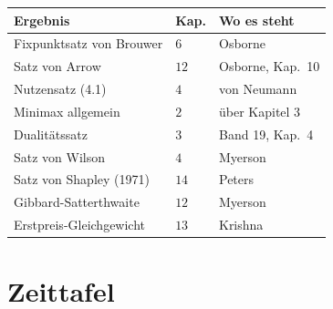 \begin{merksatz}
\begin{center}
{\small
\renewcommand{\arraystretch}{1.5}
\begin{tabular}{@{}P{3.4cm}P{1.2cm}P{3.4cm}@{}}
\toprule
\textbf{Ergebnis} & \textbf{Kap.} & \textbf{Wo es steht}\\
\midrule
Fixpunktsatz von Brouwer & $6$ & Osborne\\
Satz von Arrow & $12$ & Osborne, Kap.\ 10\\
Nutzensatz (4.1) & $4$ & von Neumann\\
Minimax allgemein & $2$ & über Kapitel 3\\
Dualitätssatz & $3$ & Band 19, Kap.\ 4\\
Satz von Wilson & $4$ & Myerson\\
Satz von Shapley (1971) & $14$ & Peters\\
Gibbard-Satterthwaite & $12$ & Myerson\\
Erstpreis-Gleichgewicht & $13$ & Krishna\\
\bottomrule
\end{tabular}}
\end{center}

\begin{center}
\begin{minipage}{0.88\textwidth}
\end{minipage}
\end{center}
\end{merksatz}

\section{Zeittafel}

